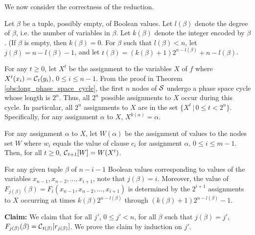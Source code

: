 \bigskip
We now consider the correctness of the reduction.

Let $\beta$ be a tuple, possibly empty, of Boolean values. 
Let  $l(\beta)$ denote the degree of $\beta$,
i.e. the number of variables in $\beta$.
Let  $k(\beta)$ denote the integer encoded by $\beta$.
(If  $\beta$ is empty, then $k(\beta) = 0$.
For $\beta$ such that $l(\beta) < n$, 
let $j(\beta) = n - l(\beta) -1$,
and let $t(\beta) = (k(\beta)+1) 2^{n-l(\beta)} +n -l(\beta)$. 

For any $ t \geq 0$,
let  $X^t$ be the assignment to the variables $X$ of $f$ where 
$X^t(x_i) = \mbox{$\mathcal{C}$} _t(y_i)$, $ 0 \leq i \leq n-1$.
From the proof in Theorem \ref{obs:long_phase_space_cycle}, 
the first $n$ nodes of $\mbox{$\mathcal{S}$}$ undergo a phase space cycle whose length is $2^n$.
Thus, all $2^n$ possible assignments to $X$ occur during this cycle.
In particular, all $2^n$ assignments to $X$ are in the set $\{  X^t \, | \, 0 \leq t < 2^n \}$.
Specifically, for any assignment $\alpha$ to $X$, $X^{k(\alpha)} = \alpha$.


For any assignment $\alpha$ to $X$, 
let $W(\alpha)$ be the assignment of values to the nodes set $W$ 
where $w_i$ equals the value of clause $c_i$ for assignment $\alpha$, $ 0 \leq i \leq m-1$.
Then,  for all $t \geq 0$, $\mbox{$\mathcal{C}$}_{t+1}[W] = W(X^t)$.

For any given tuple $\beta$ of  $n-i-1$ Boolean values 
corresponding to values of the variables $x_{n-1}, x_{n-2}, \ldots , x_{i+1}$,
note that $j(\beta) = i$.
Moreover, the value of $F_{j(\beta)}(\beta) = F_i(x_{n-1}, x_{n-2}, \ldots , x_{i+1})$
is determined by the $2^{i+1}$ assignments to $X$  occurring at times 
$k(\beta) 2^{n-l(\beta)}$ through $(k(\beta)+1) 2^{n-l(\beta)}-1$.

{\bf Claim:} We claim that for all $j'$, $0 \leq j' < n$,
for all $\beta$ such that $j(\beta) = j'$,
$F_{j(\beta)}(\beta) =\mbox{$\mathcal{C}$}_{t(\beta)}[r_{j(\beta)}]$.
We prove the claim by induction on $j'$.

